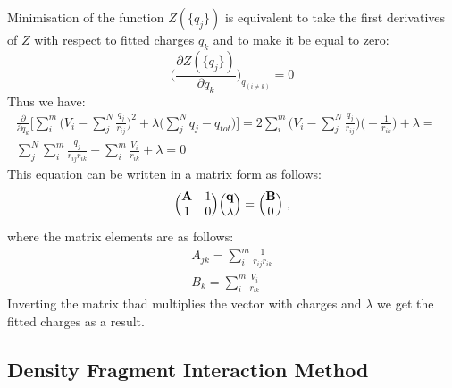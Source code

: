 \documentclass[a4paper,titlepage,twoside,fleqn]{article}
\newcommand{\pd}{\ensuremath{\partial}}
\begin{document}
Minimisation of the function $Z(\{q_j\})$ is equivalent to take the
first derivatives of $Z$ with respect to fitted charges $q_k$ 
and to make it be equal to zero:
\begin{equation}
\Bigg(\frac{\pd Z(\{q_j\})}{\pd q_k} \Bigg)_{q_{(i\ne k)}}= 0
\end{equation}
Thus we have:
\begin{eqnarray}
\frac{\pd}{\pd q_k} 
 \Bigg[
     \sum_i^m \Big(
                  V_i-\sum_j^N \frac{q_j}{r_{ij}} \Big)^2 + 
                  \lambda\Big(\sum_j^N q_j-q_{tot}
              \Big) 
 \Bigg] = 
2\sum_i^m \Big(
                  V_i-\sum_j^N \frac{q_j}{r_{ij}} \Big) \Big( -\frac{1}{r_{ik}}\Big) + 
                  \lambda = \\\nonumber
\sum_j^N \sum_i^m \frac{q_j}{r_{ij}r_{ik}} - \sum_i^m \frac{V_i}{r_{ik}} + \lambda = 0 
\qquad\qquad\qquad\qquad\qquad\qquad\qquad\qquad\qquad\qquad\quad
\end{eqnarray}
This equation can be written in a matrix form as follows:
\begin{eqnarray}
\Bigl(\begin{matrix}
\bf A & 1\\ 
1     & 0  
\end{matrix}\Bigr) \Bigl(\begin{matrix}
\bf q \\ \lambda 
\end{matrix}\Bigr) = \Bigl(\begin{matrix}
\bf B \\ 0 
\end{matrix}\Bigr) \; ,
\end{eqnarray}
where the matrix elements are as follows:
\begin{eqnarray}
A_{jk} = \sum_i^m \frac{1}{r_{ij}r_{ik}} \\
B_k    = \sum_i^m \frac{V_i}{r_{ik}}     
\end{eqnarray}
Inverting the matrix thad multiplies the vector with charges
and $\lambda$ we get the fitted charges as a result.

\subsection{Density Fragment Interaction Method}
\end{document}
